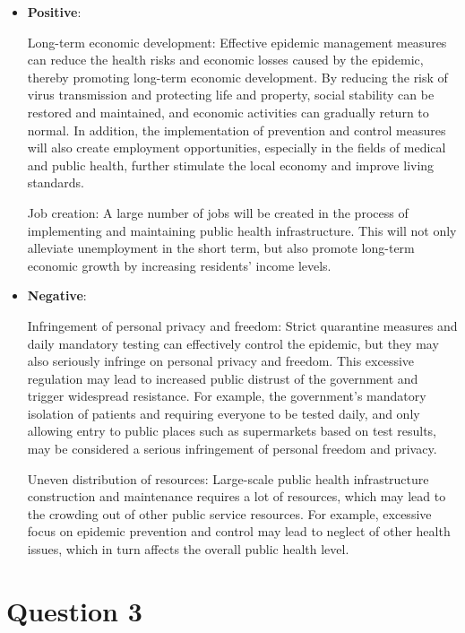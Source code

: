 \documentclass[UTF8,a4paper,AutoFakeBold,AutoFakeSlant]{article}
\begin{document}
\begin{itemize}
    \item \textbf{Positive}: 
    
    Long-term economic development: Effective epidemic management measures can reduce the health risks and economic losses caused by the epidemic, thereby promoting long-term economic development. By reducing the risk of virus transmission and protecting life and property, social stability can be restored and maintained, and economic activities can gradually return to normal. In addition, the implementation of prevention and control measures will also create employment opportunities, especially in the fields of medical and public health, further stimulate the local economy and improve living standards.

Job creation: A large number of jobs will be created in the process of implementing and maintaining public health infrastructure. This will not only alleviate unemployment in the short term, but also promote long-term economic growth by increasing residents' income levels.
    \item \textbf{Negative}: 
    
    Infringement of personal privacy and freedom: Strict quarantine measures and daily mandatory testing can effectively control the epidemic, but they may also seriously infringe on personal privacy and freedom. This excessive regulation may lead to increased public distrust of the government and trigger widespread resistance. For example, the government's mandatory isolation of patients and requiring everyone to be tested daily, and only allowing entry to public places such as supermarkets based on test results, may be considered a serious infringement of personal freedom and privacy.

    Uneven distribution of resources: Large-scale public health infrastructure construction and maintenance requires a lot of resources, which may lead to the crowding out of other public service resources. For example, excessive focus on epidemic prevention and control may lead to neglect of other health issues, which in turn affects the overall public health level.
\end{itemize}



\section{Question 3}    

\subsection{}
\end{document}
